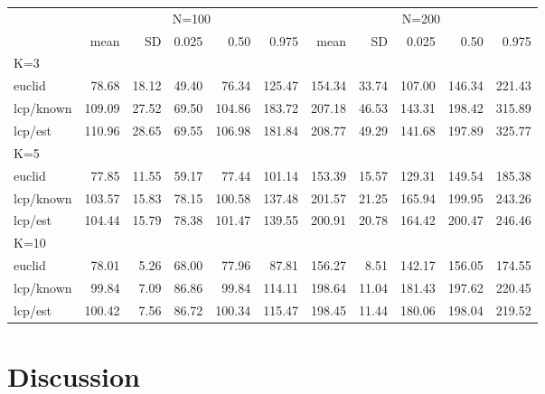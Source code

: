 \documentclass[12pt]{article}
\begin{document}
\begin{table}[ht]
{\begin{tabular}{l|rrrrrrrrrr}
         & \multicolumn{5}{c}{N=100  } & \multicolumn{5}{c}{N=200   }  \\
         &   mean &  SD  & 0.025 & 0.50  & 0.975  & mean  & SD   & 0.025 & 0.50  & 0.975 \\ \hline
K=3      &        &      &       &       &        &       &      &       &       &       \\
euclid   &  78.68 & 18.12& 49.40 & 76.34 & 125.47 & 154.34& 33.74& 107.00& 146.34& 221.43\\
lcp/known& 109.09 & 27.52& 69.50 &104.86 & 183.72 & 207.18& 46.53& 143.31& 198.42& 315.89\\
lcp/est  & 110.96 & 28.65& 69.55 &106.98 & 181.84 & 208.77& 49.29& 141.68& 197.89& 325.77\\
K=5      &        &      &       &       &        &       &      &       &       &        \\
euclid   &  77.85 & 11.55& 59.17 & 77.44 & 101.14 & 153.39& 15.57& 129.31& 149.54& 185.38\\
lcp/known& 103.57 & 15.83& 78.15 &100.58 & 137.48 & 201.57& 21.25& 165.94& 199.95& 243.26\\
lcp/est  & 104.44 & 15.79& 78.38 &101.47 & 139.55 & 200.91& 20.78& 164.42& 200.47& 246.46\\
K=10     &        &      &       &       &        &       &      &       &       &       \\
euclid   &  78.01 & 5.26 & 68.00 & 77.96 & 87.81  & 156.27&  8.51& 142.17& 156.05& 174.55\\
lcp/known&  99.84 & 7.09 & 86.86 & 99.84 & 114.11 & 198.64& 11.04& 181.43& 197.62& 220.45\\
lcp/est  & 100.42 & 7.56 & 86.72 &100.34 & 115.47 & 198.45& 11.44& 180.06& 198.04& 219.52\\ \hline
\end{tabular}
}
\label{tab.results1}
\end{table}

\section{Discussion}
\end{document}
